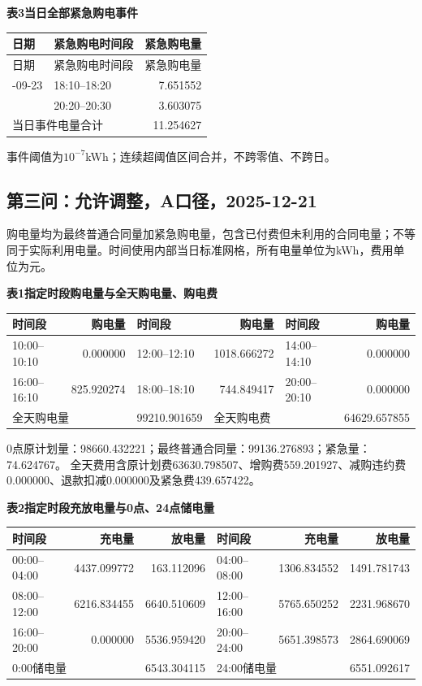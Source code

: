 \begin{center}\textbf{表3\quad 当日全部紧急购电事件}\end{center}
\begin{longtable}{llr}\toprule 日期 & 紧急购电时间段 & 紧急购电量\\\midrule\endfirsthead
\toprule 日期 & 紧急购电时间段 & 紧急购电量\\\midrule\endhead
\bottomrule\endfoot
2025-09-23 & 18:10--18:20 & 7.651552\\
 & 20:20--20:30 & 3.603075\\
\midrule\multicolumn{2}{l}{当日事件电量合计} & 11.254627\\
\end{longtable}
\noindent 事件阈值为$10^{-7}$kWh；连续超阈值区间合并，不跨零值、不跨日。
\endgroup
\clearpage
\subsection{第三问：允许调整，A口径，2025-12-21}
\begingroup\small
\setlength{\tabcolsep}{4pt}\renewcommand{\arraystretch}{1.08}
\setlength{\LTpre}{4pt}\setlength{\LTpost}{4pt}
\noindent 购电量均为最终普通合同量加紧急购电量，包含已付费但未利用的合同电量；不等同于实际利用电量。时间使用内部当日标准网格，所有电量单位为kWh，费用单位为元。
\begin{center}\textbf{表1\quad 指定时段购电量与全天购电量、购电费}\par\smallskip
\begin{tabular}{lr lr lr}\toprule
时间段 & 购电量 & 时间段 & 购电量 & 时间段 & 购电量\\\midrule
10:00--10:10 & 0.000000 & 12:00--12:10 & 1018.666272 & 14:00--14:10 & 0.000000\\
16:00--16:10 & 825.920274 & 18:00--18:10 & 744.849417 & 20:00--20:10 & 0.000000\\
\midrule
\multicolumn{2}{l}{全天购电量} & 99210.901659 & \multicolumn{2}{l}{全天购电费} & 64629.657855\\
\bottomrule\end{tabular}\end{center}
\noindent 0点原计划量：98660.432221；最终普通合同量：99136.276893；紧急量：74.624767。
全天费用含原计划费63630.798507、增购费559.201927、减购违约费0.000000、退款扣减0.000000及紧急费439.657422。
\begin{center}\textbf{表2\quad 指定时段充放电量与0点、24点储电量}\par\smallskip
\begin{tabular}{lrr lrr}\toprule
时间段 & 充电量 & 放电量 & 时间段 & 充电量 & 放电量\\\midrule
00:00--04:00 & 4437.099772 & 163.112096 & 04:00--08:00 & 1306.834552 & 1491.781743\\
08:00--12:00 & 6216.834455 & 6640.510609 & 12:00--16:00 & 5765.650252 & 2231.968670\\
16:00--20:00 & 0.000000 & 5536.959420 & 20:00--24:00 & 5651.398573 & 2864.690069\\
\midrule
\multicolumn{2}{l}{0:00储电量} & 6543.304115 & \multicolumn{2}{l}{24:00储电量} & 6551.092617\\
\bottomrule\end{tabular}\end{center}
